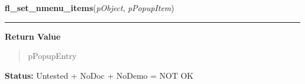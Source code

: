     \label{xformslib:library:fl_set_nmenu_items}

    \vspace{0.5ex}

\hspace{.8\funcindent}\begin{boxedminipage}{\funcwidth}

    \raggedright \textbf{fl\_set\_nmenu\_items}(\textit{pObject}, \textit{pPopupItem})

    \vspace{-1.5ex}

    \rule{\textwidth}{0.5\fboxrule}
\setlength{\parskip}{2ex}
\setlength{\parskip}{1ex}
      \textbf{Return Value}
    \vspace{-1ex}

      \begin{quote}
      pPopupEntry

      \end{quote}

\textbf{Status:} Untested + NoDoc + NoDemo = NOT OK



    \end{boxedminipage}

    \label{xformslib:library:fl_add_nmenu_items2}

    \vspace{0.5ex}

